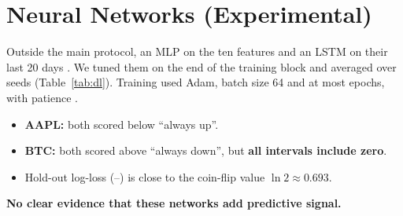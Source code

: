 \section{Neural Networks (Experimental)}
\label{sec:dl}

Outside the main protocol, an MLP on the ten features and an LSTM on their last 20
days . We tuned them on the end of the training block and averaged over
\SupSeeds{} seeds (Table~\ref{tab:dl}). Training used Adam, batch size 64 and at
most \SupMaxEpochs{} epochs, with patience \SupPatience.

\begin{itemize}
  \item \textbf{AAPL:} both scored below ``always up''.
  \item \textbf{BTC:} both scored above ``always down'', but \textbf{all \SupNCi{}
  intervals include zero}.
  \item Hold-out log-loss (\SupLossLo--\SupLossHi) is close to the coin-flip value
  $\ln 2 \approx 0.693$.
\end{itemize}

\textbf{No clear evidence that these networks add predictive signal.}


